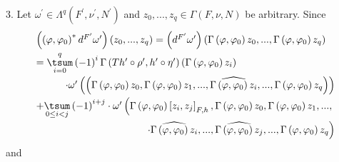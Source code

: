 \documentclass[11pt]{article}
\begin{document}
3. Let $\omega ^{\prime }\in \Lambda ^{q}\left( F^{\prime },\nu ^{\prime
},N^{\prime }\right) $ and $z_{0},...,z_{q}\in \Gamma \left( F,\nu ,N\right)
$ be arbitrary. Since
\begin{equation*}
\begin{array}{l}
\left( \left( \varphi ,\varphi _{0}\right) ^{\ast }d^{F^{\prime }}\omega
^{\prime }\right) \left( z_{0},...,z_{q}\right) =\left( d^{F^{\prime
}}\omega ^{\prime }\right) \left( \Gamma \left( \varphi ,\varphi _{0}\right)
z_{0},...,\Gamma \left( \varphi ,\varphi _{0}\right) z_{q}\right) \vspace*{%
1mm} \\
=\overset{q}{\underset{i=0}{\tsum }}\left( -1\right) ^{i}\Gamma \left(
Th^{\prime }\circ \rho ^{\prime },h^{\prime }\circ \eta ^{\prime }\right)
\left( \Gamma \left( \varphi ,\varphi _{0}\right) z_{i}\right) \vspace*{1mm}
\\
\hfill \cdot \omega ^{\prime }\left( \left( \Gamma \left( \varphi ,\varphi
_{0}\right) z_{0},\Gamma \left( \varphi ,\varphi _{0}\right) z_{1},...,%
\widehat{\Gamma \left( \varphi ,\varphi _{0}\right) z_{i}},...,\Gamma \left(
\varphi ,\varphi _{0}\right) z_{q}\right) \right) \vspace*{1mm} \\
+\underset{0\leq i<j}{\tsum }\left( -1\right) ^{i+j}\cdot \omega ^{\prime
}\left( \Gamma \left( \varphi ,\varphi _{0}\right) \left[ z_{i},z_{j}\right]
_{F,h},\Gamma \left( \varphi ,\varphi _{0}\right) z_{0},\Gamma \left(
\varphi ,\varphi _{0}\right) z_{1},...,\right. \vspace*{1mm} \\
\hfill \left. \cdot \widehat{\Gamma \left( \varphi ,\varphi _{0}\right) z_{i}%
},...,\widehat{\Gamma \left( \varphi ,\varphi _{0}\right) z_{j}},...,\Gamma
\left( \varphi ,\varphi _{0}\right) z_{q}\right)%
\end{array}%
\end{equation*}%
and
\end{document}
